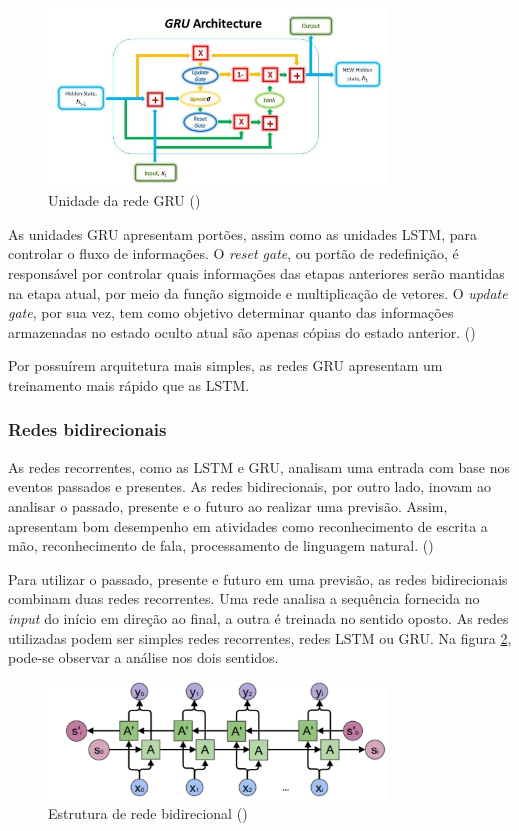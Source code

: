 \begin{figure}[H]
  \centering
  \includegraphics[width=9cm]{../figuras/redes/gru-cell.png}
  \caption{Unidade da rede GRU (\cite{deeplearningbook})}
  \label{fig:gru-cell}
\end{figure}

As unidades GRU apresentam portões, assim como as unidades LSTM,
para controlar o fluxo de informações. O \textit{reset gate}, ou
portão de redefinição, é responsável por controlar quais informações 
das etapas anteriores serão mantidas na etapa atual, por meio 
da função sigmoide e multiplicação de vetores. O \textit{update gate},
por sua vez, tem como objetivo determinar quanto das informações
armazenadas no estado oculto atual são apenas cópias do estado anterior. (\cite{d2l})

Por possuírem arquitetura mais simples, as redes GRU 
apresentam um treinamento mais rápido que as LSTM.

\subsubsection{Redes bidirecionais}

As redes recorrentes, como as LSTM e GRU, analisam uma entrada com base nos 
eventos passados e presentes. As redes bidirecionais, por outro lado, inovam ao 
analisar o passado, presente e o futuro ao realizar uma previsão. Assim, 
apresentam bom desempenho em atividades como reconhecimento de escrita a mão, reconhecimento de
fala, processamento de linguagem natural. (\cite{bidirectional})

Para utilizar o passado, presente e futuro em uma previsão, as redes 
bidirecionais combinam duas redes recorrentes. Uma rede analisa a sequência 
fornecida no \textit{input} do início em direção ao final, a outra é treinada
 no sentido oposto. As redes utilizadas podem ser simples redes 
recorrentes, redes LSTM ou GRU. Na figura \ref{fig:bi}, pode-se observar a 
análise nos dois sentidos.

\begin{figure}[H]
  \centering
  \includegraphics[width=9cm]{../figuras/redes/bi.png}
  \caption{Estrutura de rede bidirecional (\cite{bidirectional})}
  \label{fig:bi}
\end{figure}
